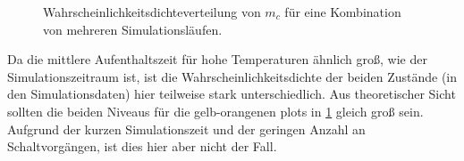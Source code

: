 \documentclass[main.tex]{subfiles}
\begin{document}
\begin{figure}[H]
    \centering
    \caption{Wahrscheinlichkeitsdichteverteilung von \(m_c\) für eine Kombination von mehreren Simulationsläufen.}\label{fig:temp-hist}    
\end{figure}

Da die mittlere Aufenthaltszeit  für hohe Temperaturen ähnlich groß, wie der Simulationszeitraum ist, ist die Wahrscheinlichkeitsdichte der beiden Zustände (in den Simulationsdaten) hier teilweise stark unterschiedlich.
Aus theoretischer Sicht sollten die beiden Niveaus für die gelb-orangenen plots in \cref{fig:temp-hist} gleich groß sein. Aufgrund der kurzen Simulationszeit und der geringen Anzahl an Schaltvorgängen, ist dies hier aber nicht der Fall.
\end{document}
